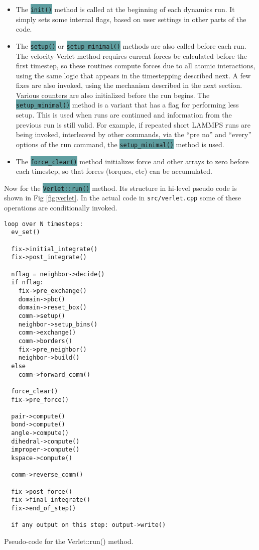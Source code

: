 \documentclass{article}
\newcommand{\path}[1]{\colorbox{light-gray}{\texttt{#1}}}
\newcommand{\code}[1]{\colorbox{cadetblue}{\color{white}\texttt{#1}}}
\begin{document}
\begin{itemize}

\item The \code{init()} method is called at the beginning of each dynamics
  run.  It simply sets some internal flags, based on user settings in
  other parts of the code.

\item The \code{setup()} or \code{setup\_minimal()} methods are also called before
  each run.  The velocity-Verlet method requires current forces be
  calculated before the first timestep, so these routines compute
  forces due to all atomic interactions, using the same logic that
  appears in the timestepping described next.  A few fixes are also
  invoked, using the mechanism described in the next section.  Various
  counters are also initialized before the run begins.  The
  \code{setup\_minimal()} method is a variant that has a flag for performing
  less setup.  This is used when runs are continued and information
  from the previous run is still valid.  For example, if repeated
  short LAMMPS runs are being invoked, interleaved by other commands,
  via the ``pre no'' and ``every'' options of the run command, the
  \code{setup\_minimal()} method is used.

\item The \code{force\_clear()} method initializes force and other arrays to
  zero before each timestep, so that forces (torques, etc) can be
  accumulated.

\end{itemize}

Now for the \code{Verlet::run()} method.  Its structure in hi-level pseudo
code is shown in Fig \ref{fig:verlet}.  In the actual code in
\path{src/verlet.cpp} some of these operations are conditionally invoked.

\begin{listing}[htb]
 \begin{center}
 \begin{verbatim}
loop over N timesteps:
  ev_set()

  fix->initial_integrate()
  fix->post_integrate()

  nflag = neighbor->decide()
  if nflag:
    fix->pre_exchange()
    domain->pbc()
    domain->reset_box()
    comm->setup()
    neighbor->setup_bins()
    comm->exchange()
    comm->borders()
    fix->pre_neighbor()
    neighbor->build()
  else
    comm->forward_comm()

  force_clear()
  fix->pre_force()

  pair->compute()
  bond->compute()
  angle->compute()
  dihedral->compute()
  improper->compute()
  kspace->compute()

  comm->reverse_comm()

  fix->post_force()
  fix->final_integrate()
  fix->end_of_step()

  if any output on this step: output->write()
  \end{verbatim}
 \end{center}
 \caption{Pseudo-code for the Verlet::run() method.}
\label{fig:verlet}
\end{listing}
\end{document}
